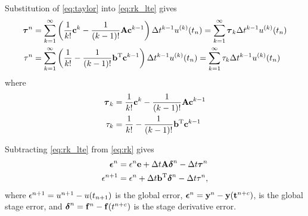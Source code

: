 Substitution of \eqref{eq:taylor} into \eqref{eq:rk_lte} gives
\begin{subequations} \label{eq:ste}
\begin{align}
\boldsymbol{\tau}^n & = \sum_{k=1}^\infty \left( \frac{1}{k!} \mathbf{c}^k - \frac{1}{(k-1)!} \mathbf{A} \mathbf{c}^{k-1}\right) \Delta t^{k-1} u^{(k)}(t_{n}) = \sum_{k=1}^\infty \boldsymbol{\tau}_k \Delta t^{k-1} u^{(k)}(t_{n}) \\
\tau^n & = \sum_{k=1}^\infty \left( \frac{1}{k!} - \frac{1}{(k-1)!} \mathbf{b}^\mathrm{T} \mathbf{c}^{k-1}\right) \Delta t^{k-1} u^{(k)}(t_{n}) = \sum_{k=1}^\infty \tau_k \Delta t^{k-1} u^{(k)}(t_{n})
\end{align}
\end{subequations} 
where 
\begin{subequations} 
\begin{align} \label{eq:ste_coeffs}
\boldsymbol{\tau}_k & = \frac{1}{k!} \mathbf{c}^k - \frac{1}{(k-1)!} \mathbf{A} \mathbf{c}^{k-1} \\
\tau_k & = \frac{1}{k!} - \frac{1}{(k-1)!} \mathbf{b}^\mathrm{T} \mathbf{c}^{k-1}
\end{align}
\end{subequations} 

Subtracting \eqref{eq:rk_lte} from \eqref{eq:rk} gives
\begin{subequations} \label{eq:gserr_series}
\begin{align}
\boldsymbol{\epsilon}^n & = \epsilon^{n} \mathbf{e} + \Delta t \mathbf{A} \boldsymbol{\delta}^n - \Delta t \boldsymbol{\tau}^n \\
\epsilon^{n+1} & = \epsilon^{n} + \Delta t \mathbf{b}^\mathrm{T} \boldsymbol{\delta}^n - \Delta t \tau^n,
\end{align}
\end{subequations}
where $\epsilon^{n+1}=u^{n+1}-u(t_{n+1})$ is the global error,
$\boldsymbol{\epsilon}^n = \mathbf{y}^n-\mathbf{y}(\mathbf{t}^{n+c})$, is the global stage error, and
$\boldsymbol{\delta}^n = \mathbf{f}^n-\mathbf{f}(t^{n+c})$ is the stage derivative error.

